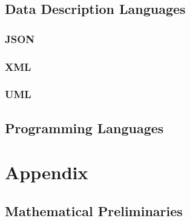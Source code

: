 \documentclass{book}
\begin{document}
\chapter{Data Description Languages}
 
 \section{JSON}

 \section{XML}
 
 \section{UML}

\chapter{Programming Languages}
 

%
%  

\part{Appendix}

\appendix

\chapter{Mathematical Preliminaries}\label{sec:math}



\tocentryBib


%
%
%
\end{document}
